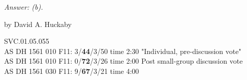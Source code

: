 	
\emph{Answer: (b).}

	by David A. Huckaby

SVC.01.05.055 \\
AS DH 1561 010 F11: 3/{\bf44}/3/50 time 2:30 "Individual, pre-discussion vote" \\
AS DH 1561 010 F11: 0/{\bf72}/3/26 time 2:00 Post small-group discussion vote \\
AS DH 1561 030 F11: 9/{\bf67}/3/21 time 4:00  \\
